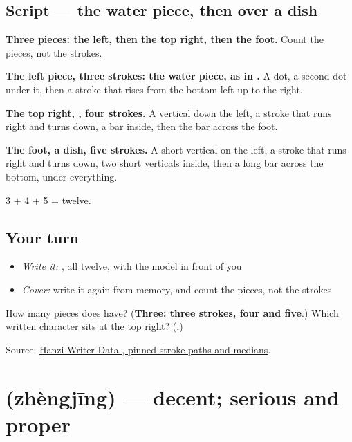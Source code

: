 \subsection*{Script — the water piece, then  over a dish}

\begin{quote}
\end{quote}

\textbf{Three pieces: the left, then the top right, then the foot.} Count the pieces, not the strokes.

\textbf{The left piece, three strokes: the water piece, as in .} A dot, a second dot under it, then a stroke that rises from the bottom left up to the right.

\textbf{The top right, , four strokes.} A vertical down the left, a stroke that runs right and turns down, a bar inside, then the bar across the foot.

\textbf{The foot, a dish, five strokes.} A short vertical on the left, a stroke that runs right and turns down, two short verticals inside, then a long bar across the bottom, under everything.

3 + 4 + 5 = twelve.

\subsection*{Your turn}
\begin{itemize}
\raggedright
  \item \emph{Write it:} , all twelve, with the model in front of you
  \item \emph{Cover:} write it again from memory, and count the pieces, not the strokes
\end{itemize}

\begin{tcolorbox}[breakable,colback=teal!4,colframe=teal!35!black,title={Before you move on}]
How many pieces does  have? (\textbf{Three: three strokes, four and five}.) Which written character sits at the top right? (\textbf{}.)

Source: \href{https://raw.githubusercontent.com/chanind/hanzi-writer-data/68d10a4b21150cae5e1ebbd223eed289cf32d90c/data/\%E6\%B8\%A9.json}{Hanzi Writer Data , pinned stroke paths and medians}.
\end{tcolorbox}
\section[\texorpdfstring{\zh{正经} (zhèngjīng)}{正经 (zhèngjīng)}]{ (zhèngjīng) — decent; serious and proper}

